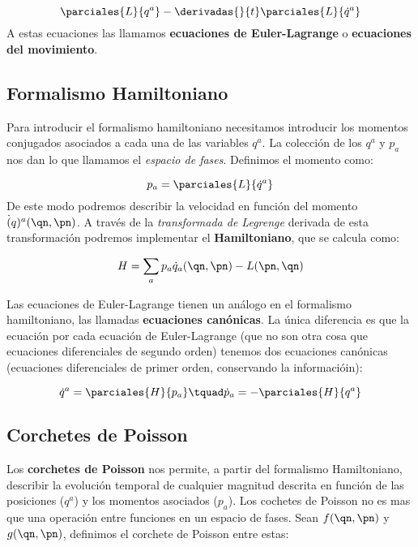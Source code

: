 \begin{equation}
    \parciales{L}{q^a} -  \derivadas{}{t} \parciales{L}{\dot{q}^a}
\end{equation} 
A estas ecuaciones las llamamos {\bf ecuaciones de Euler-Lagrange} o {\bf ecuaciones del movimiento}.

\subsection{Formalismo Hamiltoniano}

Para introducir el formalismo hamiltoniano necesitamos introducir los momentos conjugados asociados a cada una de las variables $q^a$. La colección de los $q^a$ y $p_a$ nos dan lo que llamamos el {\it espacio de fases}. Definimos el momento como:

\begin{equation}
    p_a = \parciales{L}{\dot{q}^a}
\end{equation}
De este modo podremos describir la velocidad en función del momento $\dot(q)^a (\qn,\pn)$. A través de la {\it transformada de Legrenge} derivada de esta transformación podremos implementar el {\bf Hamiltoniano}, que se calcula como:

\begin{equation}
    H = \sum_a p_a \dot{q}_a (\qn,\pn) - L(\pn,\qn)
\end{equation}

Las ecuaciones de Euler-Lagrange tienen un análogo en el formalismo hamiltoniano, las llamadas {\bf ecuaciones canónicas}. La única diferencia es que la ecuación por cada ecuación de Euler-Lagrange (que no son otra cosa que ecuaciones diferenciales de segundo orden) tenemos dos ecuaciones canónicas (ecuaciones diferenciales de primer orden, conservando la informacióin):

\begin{equation}
    \dot{q}^a = \parciales{H}{p_a} \tquad \dot{p}_a = - \parciales{H}{q^a}
\end{equation}

\subsection{Corchetes de Poisson}

Los \textbf{corchetes de Poisson} nos permite, a partir del formalismo Hamiltoniano, describir la evolución temporal de cualquier magnitud descrita en función de las posiciones ($q^a$) y los momentos asociados ($p_a$). Los cochetes de Poisson no es mas que una operación entre funciones en un espacio de fases. Sean $f(\qn,\pn)$ y $g(\qn,\pn)$, definimos el corchete de Poisson entre estas:

